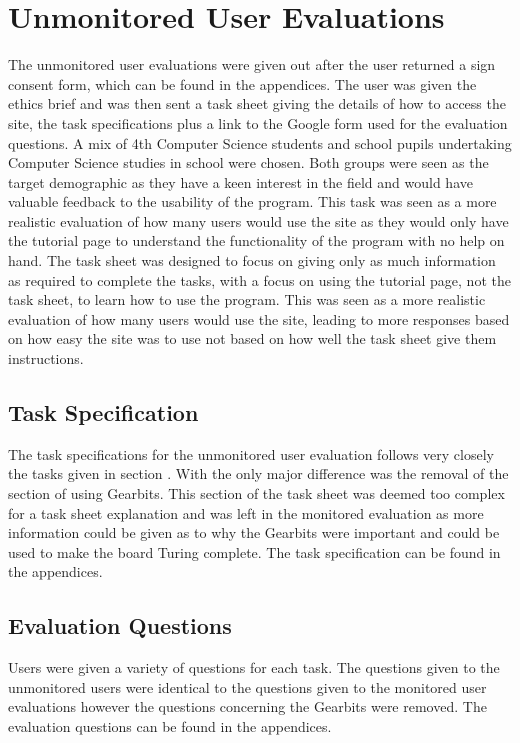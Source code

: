 \documentclass{l4proj}
\begin{document}
\section{Unmonitored User Evaluations}
The unmonitored user evaluations were given out after the user returned a sign consent form, which can be found in the appendices. The user was given the ethics brief and was then sent a task sheet giving the details of how to access the site, the task specifications plus a link to the Google form used for the evaluation questions. A mix of 4th Computer Science students and school pupils undertaking Computer Science studies in school were chosen. Both groups were seen as the target demographic as they have a keen interest in the field and would have valuable feedback to the usability of the program. This task was seen as a more realistic evaluation of how many users would use the site as they would only have the tutorial page to understand the functionality of the program with no help on hand. The task sheet was designed to focus on giving only as much information as required to complete the tasks, with a focus on using the tutorial page, not the task sheet, to learn how to use the program. This was seen as a more realistic evaluation of how many users would use the site, leading to more responses based on how easy the site was to use not based on how well the task sheet give them instructions.

\subsection{Task Specification}
The task specifications for the unmonitored user evaluation follows very closely the tasks given in section . With the only major difference was the removal of the section of using Gearbits. This section of the task sheet was deemed too complex for a task sheet explanation and was left in the monitored evaluation as more information could be given as to why the Gearbits were important and could be used to make the board Turing complete. The task specification can be found in the appendices.

\subsection{Evaluation Questions}
Users were given a variety of questions for each task. The questions given to the unmonitored users were identical to the questions given to the monitored user evaluations however the questions concerning the Gearbits were removed. The evaluation questions can be found in the appendices. 
\end{document}
